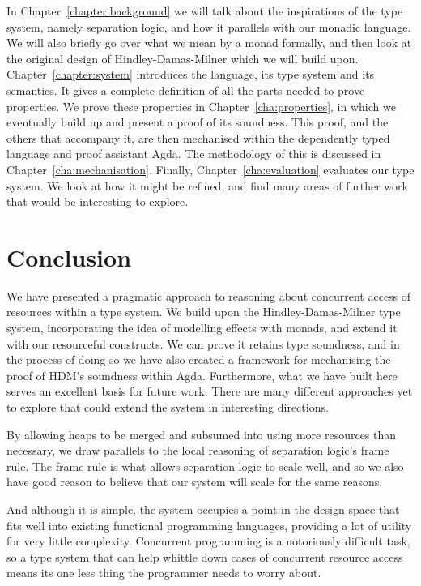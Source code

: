 \documentclass{report}
\begin{document}
In Chapter~\ref{chapter:background} we will talk about the inspirations of the
type system, namely separation logic, and how it parallels with our monadic
language. We will also briefly go over what we mean by a monad formally, and
then look at the original design of Hindley-Damas-Milner which we will build
upon.
Chapter~\ref{chapter:system} introduces the language, its type system and its
semantics.  It gives a complete definition of all the parts needed to prove
properties.  We prove these properties in Chapter~\ref{cha:properties}, in which
we eventually build up and present a proof of its soundness. This proof, and the
others that accompany it, are then mechanised within the dependently typed
language and proof assistant Agda. The methodology of this is discussed in
Chapter~\ref{cha:mechanisation}. Finally, Chapter~\ref{cha:evaluation}
evaluates our type system. We look at how it might be refined, and find many
areas of further work that would be interesting to explore.











\chapter{Conclusion}
We have presented a pragmatic approach to reasoning about concurrent access of
resources within a type system. We build upon the Hindley-Damas-Milner type
system, incorporating the idea of modelling effects with monads, and extend it
with our resourceful constructs. We can prove it retains type soundness, and in
the process of doing so we have also created a framework for mechanising the
proof of HDM's soundness within Agda.
Furthermore, what we have built here serves an excellent basis for future
work. There are many different approaches yet to explore that could extend the
system in interesting directions.

By allowing heaps to be merged and subsumed into using more resources than
necessary, we draw parallels to the local reasoning of separation logic's frame
rule. The frame rule is what allows separation logic to scale well, and so we also
have good reason to believe that our system will scale for the same reasons.

And although it is simple, the system occupies a point in the design space that
fits well into existing functional programming languages, providing a lot of
utility for very little complexity. Concurrent programming is a notoriously
difficult task, so a type system that can help whittle down cases of concurrent
resource access means its one less thing the programmer needs to worry about.





\end{document}
